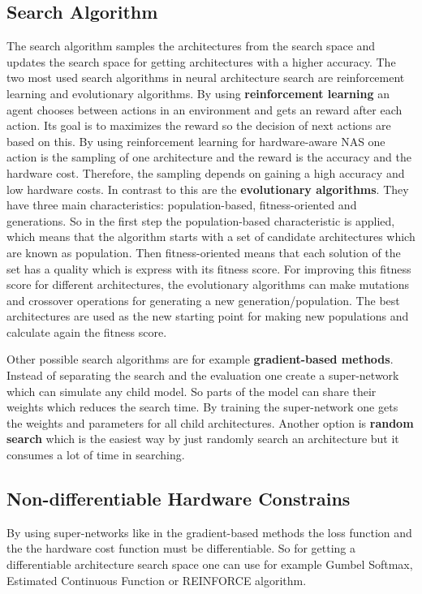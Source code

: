 \documentclass[conference]{IEEEtran}
\begin{document}
\subsection{Search Algorithm}
The search algorithm samples the architectures from the search space and updates the search space for getting architectures with a higher accuracy.
The two most used search algorithms in neural architecture search are reinforcement learning and evolutionary algorithms. By using \textbf{reinforcement learning} an agent chooses between actions in an environment and gets an reward after each action. Its goal is to maximizes the reward so the decision of next actions are based on this. By using reinforcement learning for hardware-aware NAS one action is the sampling of one architecture and the reward is the accuracy and the hardware cost. Therefore, the sampling depends on gaining a high accuracy and low hardware costs. In contrast to this are the \textbf{evolutionary algorithms}. They have three main characteristics: population-based, fitness-oriented and generations. So in the first step the population-based characteristic is applied, which means that the algorithm starts with a set of candidate architectures which are known as population. Then fitness-oriented means that each solution of the set has a quality which is express with its fitness score. For improving this fitness score for different architectures, the evolutionary algorithms can make mutations and crossover operations for generating a new generation/population. The best architectures are used as the new starting point for making new populations and calculate again the fitness score. 

Other possible search algorithms are for example \textbf{gradient-based methods}. Instead of separating the search and the evaluation one create a super-network which can simulate any child model. So parts of the model can share their weights which reduces the search time. By training the super-network one gets the weights and parameters for all child architectures. Another option is \textbf{random search} which is the easiest way by just randomly search an architecture but it consumes a lot of time in searching. 

\subsection{Non-differentiable Hardware Constrains}
By using super-networks like in the gradient-based methods the loss function and the the hardware cost function must be differentiable. So for getting a differentiable architecture search space one can use for example Gumbel Softmax, Estimated Continuous Function or REINFORCE algorithm.
\end{document}
